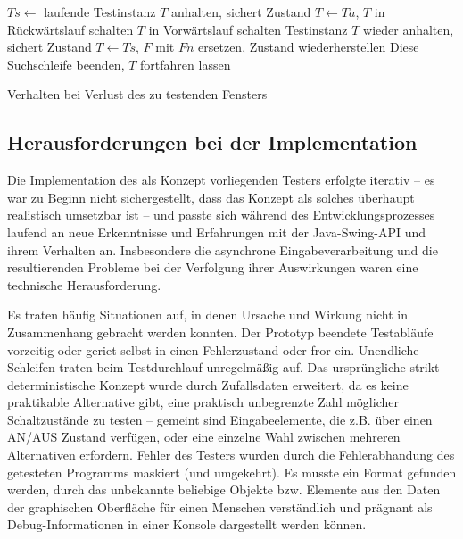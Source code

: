 \begin{algorithm} \SetAlgoLined
	$Ts \longleftarrow$ laufende Testinstanz $T$ anhalten, sichert Zustand\;
	$T \longleftarrow Ta$, $T$ in Rückwärtslauf schalten\;
	{
		{
			$T$ in Vorwärtslauf schalten\;
			Testinstanz $T$ wieder anhalten, sichert Zustand\;
			$T \longleftarrow Ts$, $F$ mit $Fn$ ersetzen, Zustand wiederherstellen\;
			Diese Suchschleife beenden, $T$ fortfahren lassen\;
		}
	}
	
	\caption{Verhalten bei Verlust des zu testenden Fensters}
	\label{alg:autotesterwindowloss}
\end{algorithm}


\subsection{Herausforderungen bei der Implementation}

Die Implementation des als Konzept vorliegenden Testers erfolgte iterativ
-- es war zu Beginn nicht sichergestellt, dass das Konzept als solches
überhaupt realistisch umsetzbar ist -- und passte sich während des
Entwicklungsprozesses laufend an neue Erkenntnisse und Erfahrungen
mit der Java-Swing-API und ihrem Verhalten an. Insbesondere
die asynchrone Eingabeverarbeitung und die resultierenden Probleme
bei der Verfolgung ihrer Auswirkungen waren eine technische Herausforderung.

Es traten häufig Situationen auf, in denen Ursache und Wirkung nicht
in Zusammenhang gebracht werden konnten. Der Prototyp beendete
Testabläufe vorzeitig oder geriet selbst in einen Fehlerzustand
oder fror ein. Unendliche Schleifen traten beim Testdurchlauf unregelmäßig auf.
Das ursprüngliche strikt deterministische Konzept wurde durch Zufallsdaten
erweitert, da es keine praktikable Alternative gibt, eine praktisch
unbegrenzte Zahl möglicher Schaltzustände zu testen -- gemeint
sind Eingabeelemente, die z.B. über einen AN/AUS Zustand verfügen,
oder eine einzelne Wahl zwischen mehreren Alternativen erfordern.
Fehler des Testers wurden durch die Fehlerabhandung des getesteten
Programms maskiert (und umgekehrt). Es musste ein Format gefunden
werden, durch das unbekannte beliebige Objekte bzw. Elemente aus den Daten
der graphischen Oberfläche für einen Menschen verständlich und prägnant
als Debug-Informationen in einer Konsole dargestellt werden können.

